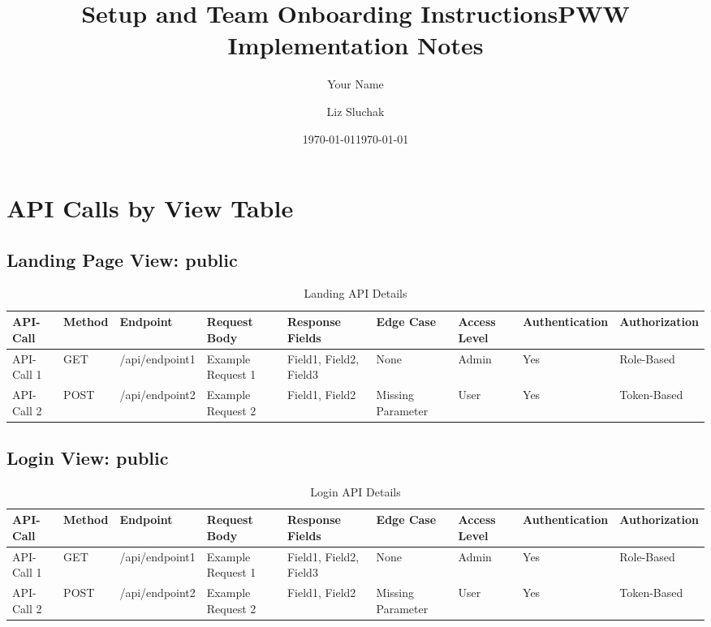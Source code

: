 \documentclass[manuscript]{acmart}
\title{Setup and Team Onboarding Instructions}
\author{Your Name}
\date{\today}
\title{PWW Implementation Notes}
\author{Liz Sluchak }
\date{\today}
\begin{document}
\maketitle
\thispagestyle{empty}
\newpage

\tableofcontents
\newpage

\section{API Calls by View Table}
\subsection{Landing Page View: public}

\begin{table*}[h!]
  \scriptsize %
  \setlength{\tabcolsep}{4pt} %
  \caption{Landing API Details}
  \label{tab:api-details}
  \begin{tabular}{llm{}
                  m{}
                  m{}
                  m{}
                  m{}
                  m{}}
    \toprule
    API-Call & Method & Endpoint & Request Body & Response Fields & Edge Case & Access Level & Authentication & Authorization \\
    \midrule
    API-Call 1 & GET & /api/endpoint1 & Example Request 1 & Field1, Field2, Field3 & None & Admin & Yes & Role-Based \\
    API-Call 2 & POST & /api/endpoint2 & Example Request 2 & Field1, Field2 & Missing Parameter & User & Yes & Token-Based \\
    \bottomrule
  \end{tabular}
\end{table*}


\subsection{Login View: public}
\begin{table*}[h!]
  \scriptsize %
  \setlength{\tabcolsep}{4pt} %
  \caption{Login API Details}
  \label{tab:api-details}
  \begin{tabular}{llm{}
                  m{}
                  m{}
                  m{}
                  m{}
                  m{}}
    \toprule
    API-Call & Method & Endpoint & Request Body & Response Fields & Edge Case & Access Level & Authentication & Authorization \\
    \midrule
    API-Call 1 & GET & /api/endpoint1 & Example Request 1 & Field1, Field2, Field3 & None & Admin & Yes & Role-Based \\
    API-Call 2 & POST & /api/endpoint2 & Example Request 2 & Field1, Field2 & Missing Parameter & User & Yes & Token-Based \\
    \bottomrule
  \end{tabular}
\end{table*}
\end{document}
